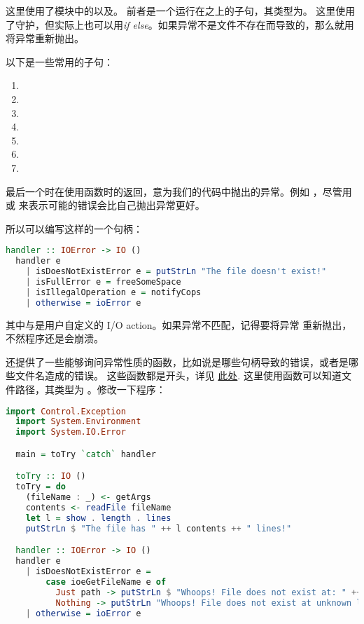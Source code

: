 \documentclass[./main.tex]{subfiles}
\begin{document}
这里使用了模块中的以及。
前者是一个运行在之上的子句，其类型为。
这里使用了守护，但实际上也可以用\textit{if else}。如果异常不是文件不存在而导致的，那么就用
将异常重新抛出。

以下是一些常用的子句：

\begin{enumerate}
  \item {}
  \item {}
  \item {}
  \item {}
  \item {}
  \item {}
  \item {}
\end{enumerate}

最后一个时在使用函数时的返回，意为我们的代码中抛出的异常。例如
，尽管用或
来表示可能的错误会比自己抛出异常更好。

所以可以编写这样的一个句柄：

\begin{lstlisting}[language=Haskell]
  handler :: IOError -> IO ()
  handler e
    | isDoesNotExistError e = putStrLn "The file doesn't exist!"
    | isFullError e = freeSomeSpace
    | isIllegalOperation e = notifyCops
    | otherwise = ioError e
\end{lstlisting}

其中与是用户自定义的 I/O action。如果异常不匹配，记得要将异常
重新抛出，不然程序还是会崩溃。

还提供了一些能够询问异常性质的函数，比如说是哪些句柄导致的错误，或者是哪些文件名造成的错误。
这些函数都是开头，详见
\href{https://downloads.haskell.org/~ghc/6.10.1/docs/html/libraries/base/System-IO-Error.html#3}{此处}.
这里使用函数可以知道文件路径，其类型为
。修改一下程序：

\begin{lstlisting}[language=Haskell]
  import Control.Exception
  import System.Environment
  import System.IO.Error

  main = toTry `catch` handler

  toTry :: IO ()
  toTry = do
    (fileName : _) <- getArgs
    contents <- readFile fileName
    let l = show . length . lines
    putStrLn $ "The file has " ++ l contents ++ " lines!"

  handler :: IOError -> IO ()
  handler e
    | isDoesNotExistError e =
        case ioeGetFileName e of
          Just path -> putStrLn $ "Whoops! File does not exist at: " ++ path
          Nothing -> putStrLn "Whoops! File does not exist at unknown location!"
    | otherwise = ioError e
\end{lstlisting}
\end{document}
